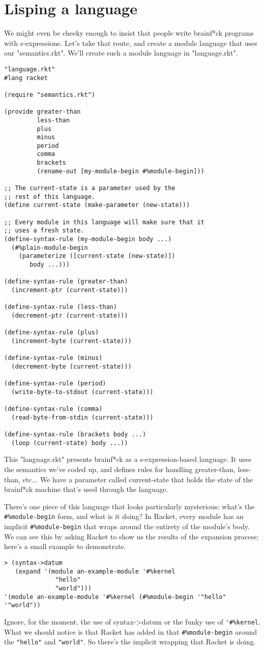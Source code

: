 \documentclass{article}
\begin{document}
\section{Lisping a language}
We might even be cheeky enough to insist that people write brainf*ck programs with s-expressions. Let’s take that route, and create a module language that uses our "semantics.rkt". We’ll create such a module language in "language.rkt".
\begin{verbatim}
"language.rkt"
#lang racket
 
(require "semantics.rkt")
 
(provide greater-than
         less-than
         plus
         minus
         period
         comma
         brackets
         (rename-out [my-module-begin #%module-begin]))
 
;; The current-state is a parameter used by the
;; rest of this language.
(define current-state (make-parameter (new-state)))
 
;; Every module in this language will make sure that it
;; uses a fresh state.
(define-syntax-rule (my-module-begin body ...)
  (#%plain-module-begin
    (parameterize ([current-state (new-state)])
       body ...)))
 
(define-syntax-rule (greater-than)
  (increment-ptr (current-state)))
 
(define-syntax-rule (less-than)
  (decrement-ptr (current-state)))
 
(define-syntax-rule (plus)
  (increment-byte (current-state)))
 
(define-syntax-rule (minus)
  (decrement-byte (current-state)))
 
(define-syntax-rule (period)
  (write-byte-to-stdout (current-state)))
 
(define-syntax-rule (comma)
  (read-byte-from-stdin (current-state)))
 
(define-syntax-rule (brackets body ...)
  (loop (current-state) body ...))
\end{verbatim}
This "language.rkt" presents brainf*ck as a s-expression-based language. It uses the semantics we’ve coded up, and defines rules for handling greater-than, less-than, etc... We have a parameter called current-state that holds the state of the brainf*ck machine that’s used through the language.

There’s one piece of this language that looks particularly mysterious: what’s the \verb+#%module-begin+ form, and what is it doing? In Racket, every module has an implicit \verb+#%module-begin+ that wraps around the entirety of the module’s body. We can see this by asking Racket to show us the results of the expansion process; here’s a small example to demonstrate.
\begin{verbatim}
> (syntax->datum
   (expand '(module an-example-module '#%kernel
              "hello"
              "world")))
'(module an-example-module '#%kernel (#%module-begin '"hello" '"world"))
\end{verbatim}
Ignore, for the moment, the use of syntax->datum or the funky use of \verb+'#%kernel+. What we should notice is that Racket has added in that \verb+#%module-begin+ around the \verb+"hello"+ and \verb+"world"+. So there’s the implicit wrapping that Racket is doing.
\end{document}
